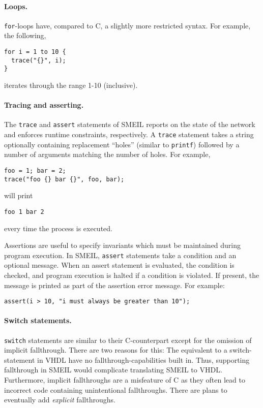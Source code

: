 \paragraph{Loops.} \texttt{for}-loops have, compared to C, a slightly more
restricted syntax. For example, the following,
\begin{lstlisting}[language=smeil]
for i = 1 to 10 {
  trace("{}", i);
}
\end{lstlisting}
iterates through the range 1-10 (inclusive).%

\paragraph{Tracing and asserting.}The {\tt trace} and {\tt assert} statements of
SMEIL reports on the state of the network and enforces runtime constraints,
respectively. A {\tt trace} statement takes a string optionally containing
replacement ``holes'' (similar to {\tt printf}) followed by a number of
arguments matching the number of holes. For example,
\begin{lstlisting}[language=smeil]
foo = 1; bar = 2;
trace("foo {} bar {}", foo, bar);
\end{lstlisting}
will print
\begin{verbatim}
foo 1 bar 2
\end{verbatim}
every time the process is executed.

Assertions are useful to specify invariants which must be maintained during
program execution. In SMEIL, {\tt assert} statements take a condition and an
optional message. When an assert statement is evaluated, the condition is
checked, and program execution is halted if a condition is violated. If present,
the message is printed as part of the assertion error message. For example:
\begin{lstlisting}[language=smeil]
assert(i > 10, "i must always be greater than 10");
\end{lstlisting}


\paragraph{Switch statements.} \texttt{switch} statements are similar to their
C-counterpart except for the omission of implicit fallthrough. There are two
reasons for this: The equivalent to a switch-statement in VHDL have no
fallthrough-capabilities built in. Thus, supporting fallthrough in SMEIL would
complicate translating SMEIL to VHDL. Furthermore, implicit fallthroughs are a
misfeature of C as they often lead to incorrect code containing unintentional
fallthroughs. There are plans to eventually add {\itshape explicit}
fallthroughs.

